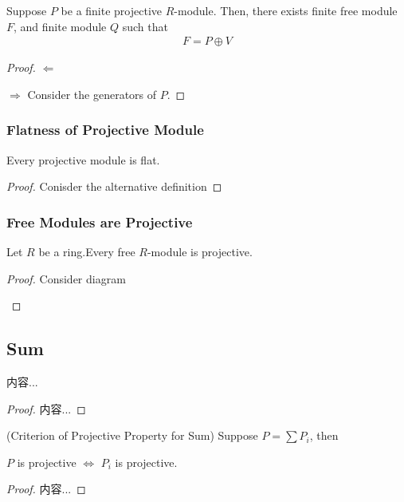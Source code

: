 \documentclass[Total.tex]{subfiles}
\begin{document}
			
			\begin{proposition}
				Suppose $P$ be a finite projective $R$-module. Then, there exists finite free module $F$, and finite module $Q$ such that
				\begin{gather*}
					F=P\oplus V
				\end{gather*}
			\end{proposition}
			\begin{proof}
				$\Leftarrow$
				
				$\Rightarrow$ Consider the generators of $P$.
			\end{proof}
			\subsubsection{Flatness of Projective Module}
			
			\begin{proposition}
				Every projective module is flat.
			\end{proposition}
			\begin{proof}
				Conisder the alternative definition
			\end{proof}
			\subsubsection{Free Modules are Projective}
			\begin{proposition}
				Let $R$ be a ring.Every free $R$-module is projective.
			\end{proposition}
			\begin{proof}
				Consider diagram
				\begin{center}
				\end{center}
			\end{proof}
			\subsection{Sum}
			\begin{lemma}
				内容...
			\end{lemma}
			\begin{proof}
				内容...
			\end{proof}
			
			\begin{proposition}
				(Criterion of Projective Property for Sum) Suppose $P=\sum P_i$, then
				\begin{center}
					$P$ is projective $\Leftrightarrow$ $P_i$ is projective.
				\end{center}
			\end{proposition}
			\begin{proof}
				内容...
			\end{proof}
			
\end{document}
